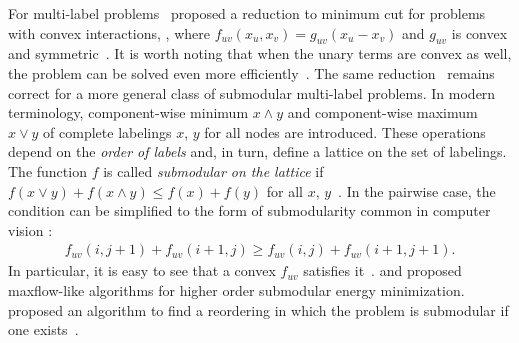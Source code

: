 %
%

For multi-label problems~\citeauthor{Ishikawa03} proposed a reduction to minimum cut for problems with convex interactions, \ie, where $f_{uv}(x_u,x_v) = g_{uv}(x_u - x_v)$ and $g_{uv}$ is convex and symmetric~\cite{Ishikawa03}. 
It is worth noting that when the unary terms are convex as well, the problem can be solved even more efficiently~\cite{Hochbaum-2001-MRF,Kolmogorov05primal-dualalgorithm}. %
The same reduction~\cite{Ishikawa03} remains correct for a more general class of submodular multi-label problems.
In modern terminology, component-wise minimum $x \wedge y$ and component-wise maximum $x \vee y$ of complete labelings $x$, $y$ for all nodes are introduced. These operations depend on the {\em order of labels} and, in turn, define a lattice on the set of labelings. The function $f$ is called {\em submodular on the lattice} if $f(x \vee y) + f(x \wedge y) \leq f(x) + f(y)$ for all $x$, $y$~\cite{Topkis-78}.
In the pairwise case, the condition can be simplified to the form of submodularity common in computer vision \cite{ramalingam2008exact}:
\begin{align} \label{eq:submodular}
f_{uv}(i, j+1) + f_{uv}(i+1, j) \geq f_{uv}(i, j) + f_{uv}(i+1, j+1).
\end{align}
In particular, it is easy to see that a convex $f_{uv}$ satisfies it~\cite{Ishikawa03}.
\citet{Kolmogorov-10} and \citet{Arora-12} proposed maxflow-like algorithms for higher order submodular energy minimization. 
\citeauthor{DSchlesinger-07-permuted} proposed an algorithm to find a reordering in which the problem is submodular if one exists~\cite{DSchlesinger-07-permuted}. 
